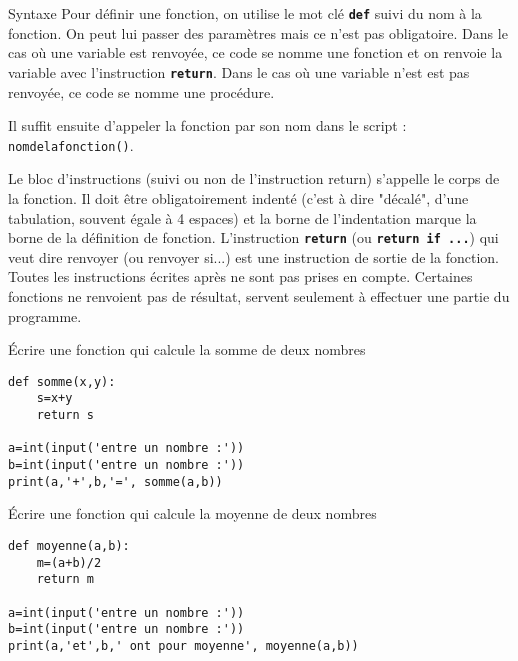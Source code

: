 \newpage

\begin{titre}

\end{titre}

\begin{DefT}{Syntaxe}
Pour définir une fonction, on utilise le mot clé \texttt{\textbf{def}} suivi du nom à la fonction. On peut lui passer des paramètres mais ce n'est pas obligatoire. 
Dans le cas où une variable est renvoyée, ce code se nomme une fonction et on renvoie la variable avec l'instruction \texttt{\textbf{return}}. Dans le cas où une variable n'est est pas renvoyée, ce code se nomme une procédure.

Il suffit ensuite d'appeler la fonction par son nom dans le script : \texttt{nomdelafonction()}.
\end{DefT}

Le bloc d’instructions (suivi ou non de l’instruction return) s’appelle le corps de la fonction. Il doit être obligatoirement
indenté (c’est à dire "décalé", d’une tabulation, souvent égale à 4 espaces) et la borne de l’indentation marque la borne
de la définition de fonction. L’instruction \texttt{\textbf{return}} (ou \texttt{\textbf{return if ...}}) qui veut dire renvoyer (ou renvoyer si...) est une instruction de sortie de la fonction. Toutes les instructions écrites après ne sont pas prises en compte. Certaines fonctions ne renvoient pas de résultat, servent seulement à effectuer une partie du programme.




\begin{ExC}{Écrire une fonction qui calcule la somme de deux nombres}
 
\begin{lstlisting}
def somme(x,y):
    s=x+y
    return s
 
a=int(input('entre un nombre :'))
b=int(input('entre un nombre :'))    
print(a,'+',b,'=', somme(a,b))
\end{lstlisting}
\end{ExC}

\begin{ExC}{Écrire une fonction qui calcule la moyenne de deux nombres}
 
\begin{lstlisting}
def moyenne(a,b):
    m=(a+b)/2
    return m
 
a=int(input('entre un nombre :'))
b=int(input('entre un nombre :'))    
print(a,'et',b,' ont pour moyenne', moyenne(a,b))
\end{lstlisting}
\end{ExC}

